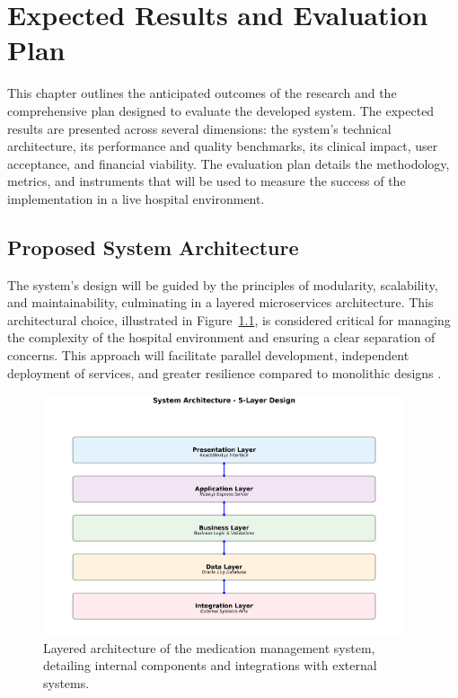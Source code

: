 \chapter{Expected Results and Evaluation Plan}
\label{chap:ExpectedResults}

This chapter outlines the anticipated outcomes of the research and the comprehensive plan designed to evaluate the developed system. The expected results are presented across several dimensions: the system's technical architecture, its performance and quality benchmarks, its clinical impact, user acceptance, and financial viability. The evaluation plan details the methodology, metrics, and instruments that will be used to measure the success of the implementation in a live hospital environment.

\section{Proposed System Architecture}

The system's design will be guided by the principles of modularity, scalability, and maintainability, culminating in a layered microservices architecture. This architectural choice, illustrated in Figure~\ref{fig:architecture}, is considered critical for managing the complexity of the hospital environment and ensuring a clear separation of concerns. This approach will facilitate parallel development, independent deployment of services, and greater resilience compared to monolithic designs \cite{newman2015}.

\begin{figure}[htbp]
    \centering
    \includegraphics[width=0.95\textwidth]{images/generated/system_architecture.png}
    \caption{Layered architecture of the medication management system, detailing internal components and integrations with external systems.}
    \label{fig:architecture}
\end{figure}

